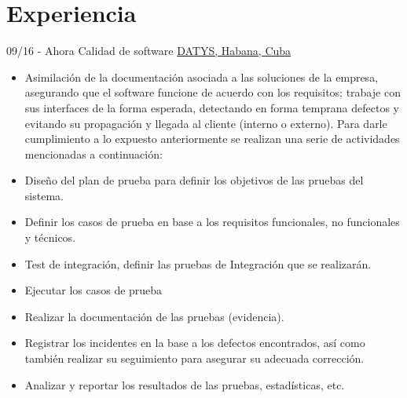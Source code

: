 \documentclass[letterpaper]{twentysecondcv} %
\begin{document}
\makeprofile %
 

\section{Experiencia}

\begin{twenty} %
\twentyitem
    	{09/16 - Ahora}
		{}
        {Calidad de software}
        {\href{http://datys.cu/}{DATYS, Habana, Cuba}}
        {}
        {
        {\begin{itemize}
        \item Asimilación de la documentación asociada a las soluciones de la empresa, asegurando que el software  funcione de acuerdo con los requisitos; trabaje con sus interfaces de la forma esperada, detectando en forma temprana defectos y evitando su propagación y llegada al cliente (interno o externo). Para darle cumplimiento a lo expuesto anteriormente se realizan una serie de actividades mencionadas a continuación:
\item Diseño del plan de prueba para definir los objetivos de las pruebas del sistema.
\item Definir los casos de prueba en base a los requisitos funcionales, no funcionales y técnicos.
\item Test de integración, definir las pruebas de Integración que se realizarán.
\item Ejecutar los casos de prueba
\item Realizar la documentación de las pruebas (evidencia).
\item Registrar los incidentes en la base a los defectos encontrados, así como también realizar su seguimiento para asegurar su adecuada corrección.
\item Analizar y reportar los resultados de las pruebas, estadísticas, etc. 
        \end{itemize}}
        }
        
\end{twenty}

\end{document}
